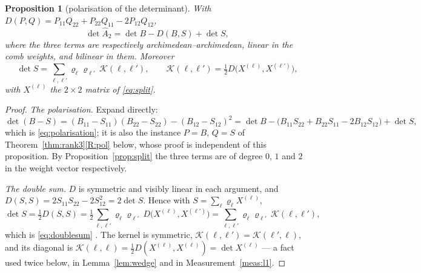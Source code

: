 \documentclass[11pt,a4paper]{article}
\theoremstyle{plain}
\newtheorem{proposition}[theorem]{Proposition}
\theoremstyle{definition}
\newcommand{\Ah}{\widehat{A}}
\begin{document}
\begin{proposition}[polarisation of the determinant]
\label{prop:polarisation}
With $D(P,Q)=P_{11}Q_{22}+P_{22}Q_{11}-2P_{12}Q_{12}$,
\begin{equation}
\label{eq:polarisation}
  \det\Ah_2=\det B-D(B,S)+\det S,
\end{equation}
where the three terms are respectively archimedean--archimedean, linear in the
comb weights, and bilinear in them. Moreover
\begin{equation}
\label{eq:doublesum}
  \det S=\sum_{\ell,\ell'}\varrho_\ell\varrho_{\ell'}\,
    \mathcal K(\ell,\ell'),
  \qquad
  \mathcal K(\ell,\ell')=\tfrac12D\bigl(X^{(\ell)},X^{(\ell')}\bigr),
\end{equation}
with $X^{(\ell)}$ the $2\times2$ matrix of \eqref{eq:split}.
\end{proposition}

\begin{proof}
\emph{The polarisation.} Expand directly:
\[
  \det(B-S)=(B_{11}-S_{11})(B_{22}-S_{22})-(B_{12}-S_{12})^{2}
  =\det B-\bigl(B_{11}S_{22}+B_{22}S_{11}-2B_{12}S_{12}\bigr)+\det S,
\]
which is \eqref{eq:polarisation}; it is also the instance $P=B$, $Q=S$ of
Theorem~\ref{thm:rank3}\ref{R:pol} below, whose proof is independent of this
proposition. By Proposition~\ref{prop:split} the three terms are of degree
$0$, $1$ and $2$ in the weight vector respectively.

\emph{The double sum.} $D$ is symmetric and visibly linear in each argument,
and $D(S,S)=2S_{11}S_{22}-2S_{12}^{2}=2\det S$. Hence with
$S=\sum_\ell\varrho_\ell X^{(\ell)}$,
\[
  \det S=\tfrac12D(S,S)
  =\tfrac12\sum_{\ell,\ell'}\varrho_\ell\varrho_{\ell'}\,
   D\bigl(X^{(\ell)},X^{(\ell')}\bigr)
  =\sum_{\ell,\ell'}\varrho_\ell\varrho_{\ell'}\,\mathcal K(\ell,\ell'),
\]
which is \eqref{eq:doublesum} \cite{Lagrange1773,CauchyBinet}. The kernel is
symmetric, $\mathcal K(\ell,\ell')=\mathcal K(\ell',\ell)$, and its diagonal is
$\mathcal K(\ell,\ell)=\tfrac12D(X^{(\ell)},X^{(\ell)})=\det X^{(\ell)}$ ---
a fact used twice below, in Lemma~\ref{lem:wedge} and in
Measurement~\ref{meas:l1}.
\end{proof}
\end{document}
